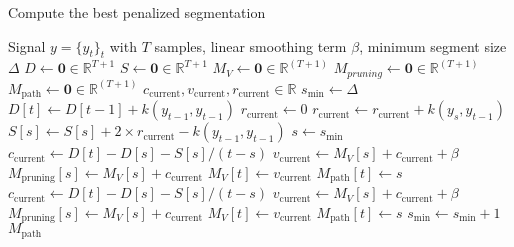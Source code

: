 \documentclass[12pt]{article}
\newcommand\RR{\mathbb{R}}
\begin{document}
\begin{algorithm}
    \footnotesize
    \caption{Compute the best penalized segmentation}
    \label{alg:pelt_min_size} %
    \begin{algorithmic} %
        \REQUIRE Signal $y = \{y_t\}_t$ with $T$ samples, linear smoothing term $\beta$, minimum segment size $\Delta$
        \STATE {}
        \STATE $D \gets \bm{0}\in\mathbb{R}^{T+1}$ 
        \STATE $S \gets \bm{0}\in\mathbb{R}^{T+1}$ 
        \STATE $M_V \gets \bm{0}\in\mathbb{R}^{(T+1)}$ 
        \STATE $M_{pruning} \gets \bm{0}\in\mathbb{R}^{(T+1)}$ 
        \STATE $M_{\text{path}} \gets \bm{0}\in\mathbb{R}^{(T+1)}$ 
        \STATE $c_{\text{current}}, v_{\text{current}}, r_{\text{current}}\in\RR$ 
        \STATE $s_{\text{min}}\gets \Delta$ 
        \STATE
        \STATE {}
        \STATE $D[t] \gets D[t-1] + k(y_{t-1}, y_{t-1})$ 
        \STATE {}
        \STATE $r_{\text{current}}\gets0$
        \STATE $r_{\text{current}} \gets r_{\text{current}} + k(y_{s}, y_{t-1})$ 
        \STATE $S[s] \gets S[s] + 2\times r_{\text{current}} - k(y_{t-1}, y_{t-1}) $ 
        \ENDFOR
        \STATE {}
        \STATE $s\gets s_{\text{min}} $
        \STATE $c_{\text{current}} \gets D[t]-D[s] - S[s]/(t-s)$ 
        \STATE $v_{\text{current}} \gets M_V[s] + c_{\text{current}} + \beta$ 
        \STATE $M_{\text{pruning}}[s] \gets M_V[s] + c_{\text{current}}$ 
        \STATE $M_V[t] \gets v_{\text{current}}$
        \STATE $M_{\text{path}}[t] \gets s$
        \STATE $c_{\text{current}} \gets D[t]-D[s] - S[s]/(t-s)$ 
        \STATE $v_{\text{current}} \gets M_V[s] + c_{\text{current}} + \beta$ 
        \STATE $M_{\text{pruning}}[s] \gets M_V[s] + c_{\text{current}}$
        \STATE $M_V[t] \gets v_{\text{current}}$
        \STATE $M_{\text{path}}[t] \gets s$
        \ENDIF
        \ENDFOR
        \STATE {}
        \STATE $s_{\text{min}}\gets s_{\text{min}} + 1$
        \ENDWHILE
        \ENDFOR
        \RETURN $M_{\text{path}}$
    \end{algorithmic}
\end{algorithm}





\end{document}

